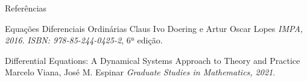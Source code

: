 \documentclass{beamer}
\begin{document}
\begin{frame}{Referências}
    \begin{thebibliography}{5} %
		
		
		\beamertemplatearticlebibitems
		Equações Diferenciais Ordinárias
		\newblock Claus Ivo Doering e Artur Oscar Lopes
		\newblock \emph{IMPA, 2016}.
		\newblock \emph{ISBN: 978-85-244-0425-2}, 6ª edição.

        \beamertemplatearticlebibitems
		Differential Equations: A Dynamical Systems Approach to Theory and Practice
		\newblock Marcelo Viana, José M. Espinar
		\newblock \emph{Graduate Studies in Mathematics, 2021}.
		
	\end{thebibliography}
\end{frame}
\end{document}
